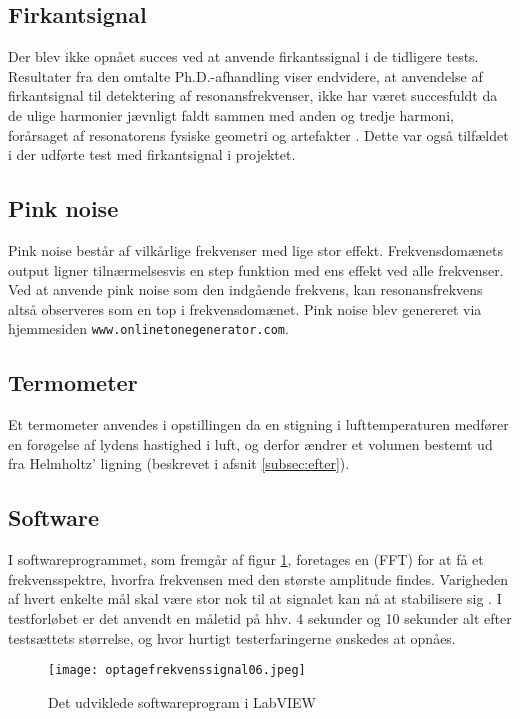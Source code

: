 \subsection{Firkantsignal}
Der blev ikke opnået succes ved at anvende firkantssignal i de tidligere tests. Resultater fra den omtalte Ph.D.-afhandling viser endvidere, at anvendelse af firkantsignal til detektering af resonansfrekvenser, ikke har været succesfuldt da de ulige harmonier jævnligt faldt sammen med anden og tredje harmoni, forårsaget af resonatorens fysiske geometri og artefakter \citep{RefWorks:22}. Dette var også tilfældet i der udførte test med firkantsignal i projektet. 

\subsection{Pink noise}
Pink noise består af vilkårlige frekvenser med lige stor effekt. Frekvensdomænets output ligner tilnærmelsesvis en step funktion med ens effekt ved alle frekvenser. Ved at anvende pink noise som den indgående frekvens, kan resonansfrekvens altså observeres som en top i frekvensdomænet. 
Pink noise blev genereret via hjemmesiden \texttt{www.onlinetonegenerator.com}. 

\subsection{Termometer}
Et termometer anvendes i opstillingen da en stigning i lufttemperaturen medfører en forøgelse af lydens hastighed i luft, og derfor ændrer et volumen bestemt ud fra Helmholtz' ligning (beskrevet i afsnit \ref{subsec:efter}). 

\subsection{Software}
 I softwareprogrammet, som fremgår af figur \ref{fig:VI06O}, foretages en (FFT) for at få et frekvensspektre, hvorfra frekvensen med den største amplitude findes. 
 Varigheden af hvert enkelte mål skal være stor nok til at signalet kan nå at stabilisere sig \citep{RefWorks:22}. I testforløbet er det anvendt en måletid på hhv. 4 sekunder og 10 sekunder alt efter testsættets størrelse, og hvor hurtigt testerfaringerne ønskedes at opnåes. 
 
 \begin{figure}[!h]	
\centering
\texttt{[image: optagefrekvenssignal06.jpeg]}
\caption{Det udviklede softwareprogram i LabVIEW}
\label{fig:VI06O}
 \end{figure}

